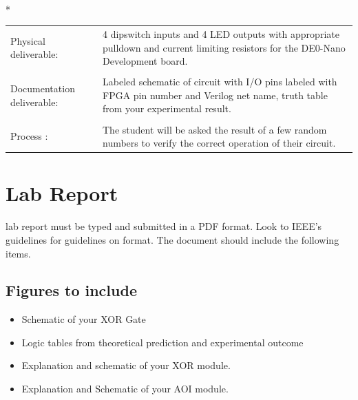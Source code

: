       \vspace{15px}
      \begin{centering}
        \begin{fminipage}{.43\textwidth}
          \vspace{3px}
          \\*
          \vspace{10px}
          \begin{tabular}{p{1.8cm}  p{5.4cm}}
            \raggedright Physical deliverable:        &4 dipswitch inputs and 4 LED outputs with appropriate pulldown and current limiting resistors for the DE0-Nano Development board. \\
            \\
            \raggedright Documentation deliverable:   & Labeled schematic of circuit with I/O pins labeled with FPGA pin number and Verilog net name,  truth table from your  experimental result.\\
            \\
            Process :                                 &The student will be asked the result of a few random numbers to verify the correct operation of their circuit.
          \end{tabular}
        \end{fminipage}
      \end{centering}

  \section{Lab Report}
     lab report must be typed and submitted in a PDF format. Look to IEEE's guidelines for  guidelines on format. The document should include the following items.
    
    \subsection{Figures to include}
    \begin{itemize}
      \item Schematic of your XOR Gate
      \item Logic tables from theoretical prediction and experimental outcome
      \item Explanation and schematic of your XOR module.
      \item Explanation and Schematic of your AOI module.
    \end{itemize}

